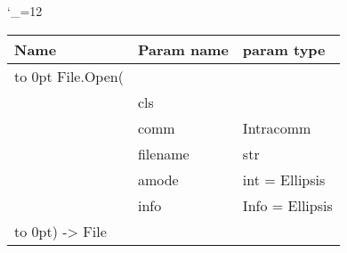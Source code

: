 \begingroup \catcode`\_=12 \tt
\begin{tabular}{lll}
\toprule
\textrm{Name}&\textrm{Param name}&\textrm{param type}\\
\midrule
\hbox to 0pt {File.Open(\hss}\\
& cls\\
& comm & Intracomm\\
& filename & str\\
& amode & int = Ellipsis\\
& info & Info = Ellipsis\\
\hbox to 0pt{) -> File\hss}\\
\bottomrule
\end{tabular}
\endgroup
